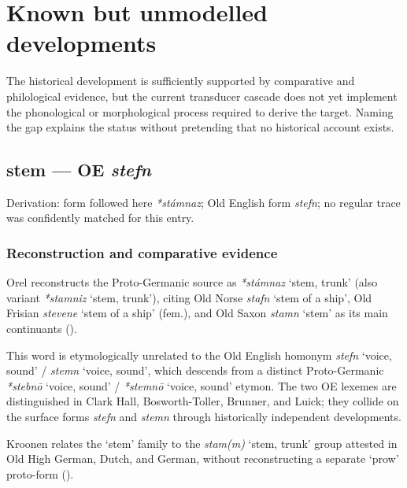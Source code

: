 \documentclass[
  british,
  a4paper,
  openany]{book}
\providecommand{\Recon}[1]{\emph{*#1}}
{\catcode`→=\active \global\def→{\ensuremath{\rightarrow}}}
\providecommand{\texorpdfstring}[2]{#1}
\providecommand{\Recon}[1]{\emph{*#1}}
{\catcode`→=\active \global\def→{\ensuremath{\rightarrow}}}
\begin{document}
\clearpage

\chapter{Known but unmodelled
developments}\label{known-but-unmodelled-developments}

The historical development is sufficiently supported by comparative and
philological evidence, but the current transducer cascade does not yet
implement the phonological or morphological process required to derive
the target. Naming the gap explains the status without pretending that
no historical account exists.

\section{\texorpdfstring{stem --- OE
\emph{stefn}}{stem --- OE stefn}}\label{stem-oe-stefn}


Derivation: form followed here \emph{*stámnaz}; Old English form
\emph{stefn}; no regular trace was confidently matched for this entry.

\subsection{Reconstruction and comparative
evidence}\label{reconstruction-and-comparative-evidence-139}

Orel reconstructs the Proto-Germanic source as \Recon{stámnaz} `stem,
trunk' (also variant \Recon{stamniz} `stem, trunk'), citing Old Norse
{\emph{stafn}} `stem of a ship', Old Frisian {\emph{stevene}} `stem of a
ship' (fem.), and Old Saxon {\emph{stamn}} `stem' as its main
continuants ().

This word is etymologically unrelated to the Old English homonym
\emph{stefn} `voice, sound' / \emph{stemn} `voice, sound', which
descends from a distinct Proto-Germanic \Recon{stebnō} `voice, sound' /
\Recon{stemnō} `voice, sound' etymon. The two OE lexemes are
distinguished in Clark Hall, Bosworth-Toller, Brunner, and Luick; they
collide on the surface forms \emph{stefn} and \emph{stemn} through
historically independent developments.

Kroonen relates the `stem' family to the \emph{stam(m)} `stem, trunk'
group attested in Old High German, Dutch, and German, without
reconstructing a separate `prow' proto-form
().
\end{document}

